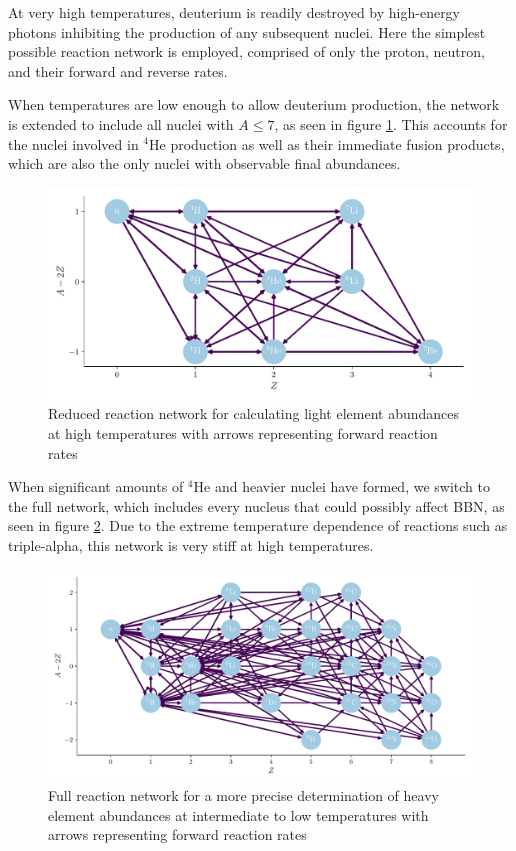 At very high temperatures, deuterium is readily destroyed by high-energy photons inhibiting the production of any subsequent nuclei. Here the simplest possible reaction network is employed, comprised of only the proton, neutron, and their forward and reverse rates. 

When temperatures are low enough to allow deuterium production, the network is extended to include all nuclei with $A\leq 7$, as seen in figure \ref{fig:smallnet}. This accounts for the nuclei involved in ${}^4$He production as well as their immediate fusion products, which are also the only nuclei with observable final abundances. 

\begin{figure}[ht]
    \includegraphics[width=5.1in]{figures/lillenet.pdf}
    \caption{Reduced reaction network for calculating light element abundances at high temperatures with arrows representing forward reaction rates}
    \label{fig:smallnet}
\end{figure}

When significant amounts of ${}^4$He and heavier nuclei have formed, we switch to the full network, which includes every nucleus that could possibly affect BBN, as seen in figure \ref{fig:bignet}. Due to the extreme temperature dependence of reactions such as triple-alpha, this network is very stiff at high temperatures. 

\begin{figure}[ht]
    \includegraphics[width=5.1in]{figures/stornet.pdf}
    \caption{Full reaction network for a more precise determination of heavy element abundances at intermediate to low temperatures with arrows representing forward reaction rates}
    \label{fig:bignet}
\end{figure}
\clearpage
